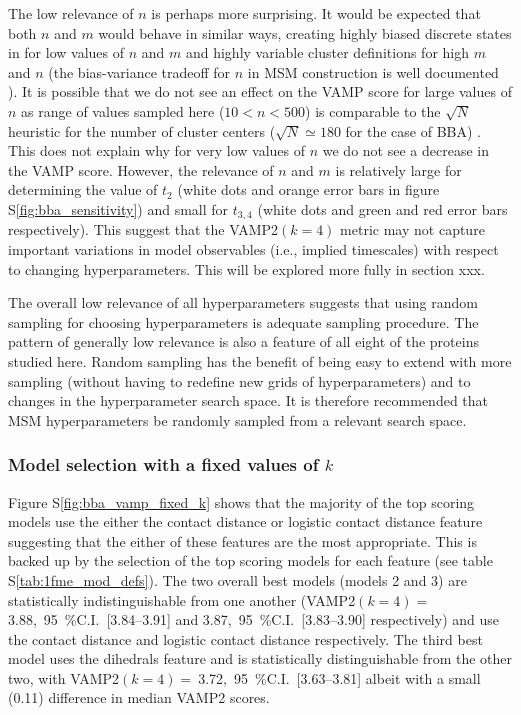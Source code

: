 \documentclass[journal=jacsat,manuscript=article]{achemso}
\newcommand{\numci}[3]{\num{#1},\ \SI{95}{\percent}C.I.\ [\numrange[range-phrase=---]{#2}{#3}]}
\newcommand*\sref[1]{%
    S\ref{#1}}
\begin{document}
The low relevance of $n$ is perhaps more surprising. It would be expected that both $n$ and $m$ would behave in similar ways, creating highly biased discrete states in for low values of $n$ and $m$ and highly variable cluster definitions for high $m$ and $n$ (the bias-variance tradeoff for $n$ in MSM construction is well documented \cite{mcgibbonVariationalCrossvalidationSlow2015, wuVariationalApproachLearning2020c}). It is possible that we do not see an effect on the VAMP score for large values of $n$ as range of values sampled here ($10 < n <500$) is comparable to the $\sqrt{N}$ heuristic for the number of cluster centers ($\sqrt{N} \simeq 180$ for the case of BBA) \cite{Ward_Clust2017}. This does not explain why for very low values of $n$ we do not see a decrease in the VAMP score. However, the relevance of $n$ and $m$ is relatively large for determining the value of $t_{2}$ (white dots and orange error bars in figure \sref{fig:bba_sensitivity}) and small for $t_{3, 4}$ (white dots and green and red error bars respectively). This suggest that the VAMP2$(k=4)$ metric may not capture important variations in model observables (i.e., implied timescales) with respect to changing hyperparameters. This will be explored more fully in section xxx.   

The overall low relevance of all hyperparameters suggests that using random sampling for choosing hyperparameters is adequate sampling procedure. The pattern of generally low relevance is also a feature of all eight of the proteins studied here.  Random sampling has the benefit of being easy to extend with more sampling (without having to redefine new grids of hyperparameters) and to changes in the hyperparameter search space. It is therefore recommended that MSM hyperparameters be randomly sampled from a relevant search space.    

\subsubsection{Model selection with a fixed values of $k$}

Figure \sref{fig:bba_vamp_fixed_k} shows that the majority of the top scoring models use the either the contact distance or logistic contact distance feature suggesting that the either of these features are the most appropriate. This is backed up by the selection of the top scoring models for each feature (see table \sref{tab:1fme_mod_defs}). The two overall best models (models 2 and 3) are statistically indistinguishable from one another (VAMP2$(k=4)=\ $\numci{3.88}{3.84}{3.91} and \numci{3.87}{3.83}{3.90} respectively) and use the contact distance and logistic contact distance respectively. The third best model uses the dihedrals feature and is statistically distinguishable from the other two, with VAMP2$(k=4) =\ $\numci{3.72}{3.63}{3.81} albeit with a small (0.11) difference in median VAMP2 scores.  
\end{document}
